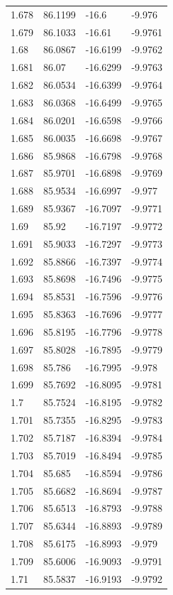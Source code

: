 \begin{tabular}{llll}
1.678 & 86.1199 & -16.6 & -9.976 \\
1.679 & 86.1033 & -16.61 & -9.9761 \\
1.68 & 86.0867 & -16.6199 & -9.9762 \\
1.681 & 86.07 & -16.6299 & -9.9763 \\
1.682 & 86.0534 & -16.6399 & -9.9764 \\
1.683 & 86.0368 & -16.6499 & -9.9765 \\
1.684 & 86.0201 & -16.6598 & -9.9766 \\
1.685 & 86.0035 & -16.6698 & -9.9767 \\
1.686 & 85.9868 & -16.6798 & -9.9768 \\
1.687 & 85.9701 & -16.6898 & -9.9769 \\
1.688 & 85.9534 & -16.6997 & -9.977 \\
1.689 & 85.9367 & -16.7097 & -9.9771 \\
1.69 & 85.92 & -16.7197 & -9.9772 \\
1.691 & 85.9033 & -16.7297 & -9.9773 \\
1.692 & 85.8866 & -16.7397 & -9.9774 \\
1.693 & 85.8698 & -16.7496 & -9.9775 \\
1.694 & 85.8531 & -16.7596 & -9.9776 \\
1.695 & 85.8363 & -16.7696 & -9.9777 \\
1.696 & 85.8195 & -16.7796 & -9.9778 \\
1.697 & 85.8028 & -16.7895 & -9.9779 \\
1.698 & 85.786 & -16.7995 & -9.978 \\
1.699 & 85.7692 & -16.8095 & -9.9781 \\
1.7 & 85.7524 & -16.8195 & -9.9782 \\
1.701 & 85.7355 & -16.8295 & -9.9783 \\
1.702 & 85.7187 & -16.8394 & -9.9784 \\
1.703 & 85.7019 & -16.8494 & -9.9785 \\
1.704 & 85.685 & -16.8594 & -9.9786 \\
1.705 & 85.6682 & -16.8694 & -9.9787 \\
1.706 & 85.6513 & -16.8793 & -9.9788 \\
1.707 & 85.6344 & -16.8893 & -9.9789 \\
1.708 & 85.6175 & -16.8993 & -9.979 \\
1.709 & 85.6006 & -16.9093 & -9.9791 \\
1.71 & 85.5837 & -16.9193 & -9.9792 \\

\end{tabular}
